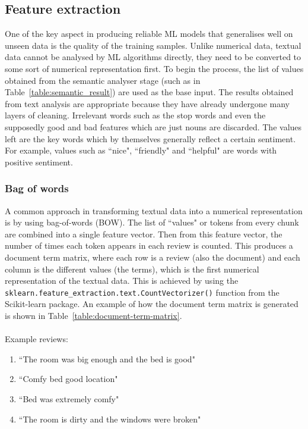 \documentclass[a4paper]{report}
\newcommand{\code}[1]{\texttt{#1}}
\begin{document}
\subsection{Feature extraction}
One of the key aspect in producing reliable ML models that generalises well on unseen data is the quality of the training samples. Unlike numerical data, textual data cannot be analysed by ML algorithms directly, they need to be converted to some sort of numerical representation first. To begin the process, the list of values obtained from the semantic analyser stage (such as in Table~\ref{table:semantic_result}) are used as the base input. The results obtained from text analysis are appropriate because they have already undergone many layers of cleaning. Irrelevant words such as the stop words and even the supposedly good and bad features which are just nouns are discarded. The values left are the key words which by themselves generally reflect a certain sentiment. For example, values such as ``nice", ``friendly" and ``helpful" are words with positive sentiment.

\subsubsection{Bag of words}
A common approach in transforming textual data into a numerical representation is by using bag-of-words (BOW). The list of ``values" or tokens from every chunk are combined into a single feature vector. Then from this feature vector, the number of times each token appears in each review is counted. This produces a document term matrix, where each row is a review (also the document) and each column is the different values (the terms), which is the first numerical representation of the textual data. This is achieved by using the \code{sklearn.feature\_extraction.text.CountVectorizer()} function from the Scikit-learn package. An example of how the document term matrix is generated is shown in Table~\ref{table:document-term-matrix}.
\\\\
Example reviews:
\begin{enumerate}
  \item ``The room was big enough and the bed is good"
  \item ``Comfy bed good location"
  \item ``Bed was extremely comfy"
  \item ``The room is dirty and the windows were broken"
\end{enumerate}
\end{document}

